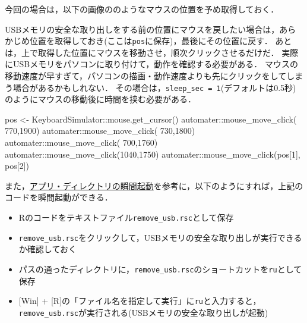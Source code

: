 \documentclass[
]{article}
\newenvironment{Shaded}{\begin{snugshade}}{\end{snugshade}}
\newcommand{\DecValTok}[1]{\textcolor[rgb]{0.00,0.00,0.81}{#1}}
\newcommand{\FunctionTok}[1]{\textcolor[rgb]{0.00,0.00,0.00}{#1}}
\newcommand{\NormalTok}[1]{#1}
\newcommand{\OtherTok}[1]{\textcolor[rgb]{0.56,0.35,0.01}{#1}}
\newcommand{\SpecialCharTok}[1]{\textcolor[rgb]{0.00,0.00,0.00}{#1}}
\providecommand{\tightlist}{%
  \setlength{\itemsep}{0pt}\setlength{\parskip}{0pt}}
\begin{document}
今回の場合は，以下の画像ののようなマウスの位置を予め取得しておく．

USBメモリの安全な取り出しをする前の位置にマウスを戻したい場合は，あらかじめ位置を取得しておき(ここは\texttt{pos}に保存)，最後にその位置に戻す．
あとは，上で取得した位置にマウスを移動させ，順次クリックさせるだけだ．
実際にUSBメモリをパソコンに取り付けて，動作を確認する必要がある．
マウスの移動速度が早すぎて，パソコンの描画・動作速度よりも先にクリックをしてしまう場合があるかもしれない．
その場合は，\texttt{sleep\_sec\ =\ 1}(デフォルトは0.5秒)のようにマウスの移動後に時間を挟む必要がある．

\begin{Shaded}
\begin{Highlighting}[]
\NormalTok{pos }\OtherTok{\textless{}{-}}\NormalTok{ KeyboardSimulator}\SpecialCharTok{::}\FunctionTok{mouse.get\_cursor}\NormalTok{()}
\NormalTok{automater}\SpecialCharTok{::}\FunctionTok{mouse\_move\_click}\NormalTok{( }\DecValTok{770}\NormalTok{,}\DecValTok{1900}\NormalTok{)}
\NormalTok{automater}\SpecialCharTok{::}\FunctionTok{mouse\_move\_click}\NormalTok{( }\DecValTok{730}\NormalTok{,}\DecValTok{1800}\NormalTok{)}
\NormalTok{automater}\SpecialCharTok{::}\FunctionTok{mouse\_move\_click}\NormalTok{( }\DecValTok{700}\NormalTok{,}\DecValTok{1760}\NormalTok{)}
\NormalTok{automater}\SpecialCharTok{::}\FunctionTok{mouse\_move\_click}\NormalTok{(}\DecValTok{1040}\NormalTok{,}\DecValTok{1750}\NormalTok{)}
\NormalTok{automater}\SpecialCharTok{::}\FunctionTok{mouse\_move\_click}\NormalTok{(pos[}\DecValTok{1}\NormalTok{], pos[}\DecValTok{2}\NormalTok{])}
\end{Highlighting}
\end{Shaded}

また，\protect\hyperlink{run_inux5cux2520a_second}{アプリ・ディレクトリの瞬間起動}を参考に，以下のようにすれば，上記のコードを瞬間起動ができる．

\begin{itemize}
\tightlist
\item
  Rのコードをテキストファイル\texttt{remove\_usb.rsc}として保存\\
\item
  \texttt{remove\_usb.rsc}をクリックして，USBメモリの安全な取り出しが実行できるか確認しておく\\
\item
  パスの通ったディレクトリに，\texttt{remove\_usb.rsc}のショートカットを\texttt{ru}として保存\\
\item
  {[}Win{]} + {[}R{]}の「ファイル名を指定して実行」に\texttt{ru}と入力すると，\texttt{remove\_usb.rsc}が実行される(USBメモリの安全な取り出しが起動)
\end{itemize}
\end{document}
